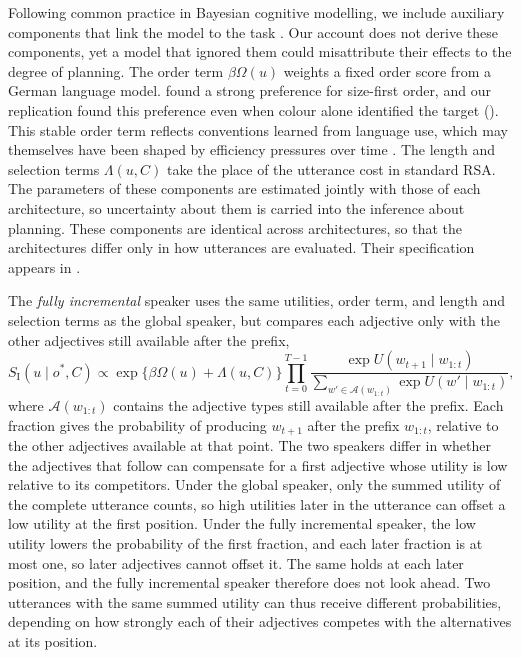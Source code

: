 \documentclass[10pt,a4paper,fleqn]{article}
\begin{document}
Following common practice in Bayesian cognitive modelling, we include auxiliary components that link the model to the task \citep{lee2013bayesian,franke2016task}.
Our account does not derive these components, yet a model that ignored them could misattribute their effects to the degree of planning.
The order term $\beta\Omega(u)$ weights a fixed order score from a German language model.
\citet[p.~124]{schlotterbeck2023incremental} found a strong preference for size-first order, and our replication found this preference even when colour alone identified the target ().
This stable order term reflects conventions learned from language use, which may themselves have been shaped by efficiency pressures over time \citep{franke2019subjectivity}.
The length and selection terms $\Lambda(u,C)$ take the place of the utterance cost in standard RSA.
The parameters of these components are estimated jointly with those of each architecture, so uncertainty about them is carried into the inference about planning.
These components are identical across architectures, so that the architectures differ only in how utterances are evaluated.
Their specification appears in .

The \emph{fully incremental} speaker uses the same utilities, order term, and length and selection terms as the global speaker, but compares each adjective only with the other adjectives still available after the prefix,
\begin{equation}
  S_{\mathrm{I}}(u\mid o^*,C)
  \propto
  \exp\!\bigl\{\beta\Omega(u)+\Lambda(u,C)\bigr\}
  \prod_{t=0}^{T-1}
  \frac{\exp U(w_{t+1}\mid w_{1:t})}
       {\sum_{w'\in\mathcal A(w_{1:t})}\exp U(w'\mid w_{1:t})},
  \label{eq:incremental-speaker}
\end{equation}
where $\mathcal A(w_{1:t})$ contains the adjective types still available after the prefix.
Each fraction gives the probability of producing $w_{t+1}$ after the prefix $w_{1:t}$, relative to the other adjectives available at that point.
The two speakers differ in whether the adjectives that follow can compensate for a first adjective whose utility is low relative to its competitors.
Under the global speaker, only the summed utility of the complete utterance counts, so high utilities later in the utterance can offset a low utility at the first position.
Under the fully incremental speaker, the low utility lowers the probability of the first fraction, and each later fraction is at most one, so later adjectives cannot offset it.
The same holds at each later position, and the fully incremental speaker therefore does not look ahead.
Two utterances with the same summed utility can thus receive different probabilities, depending on how strongly each of their adjectives competes with the alternatives at its position.
\end{document}
